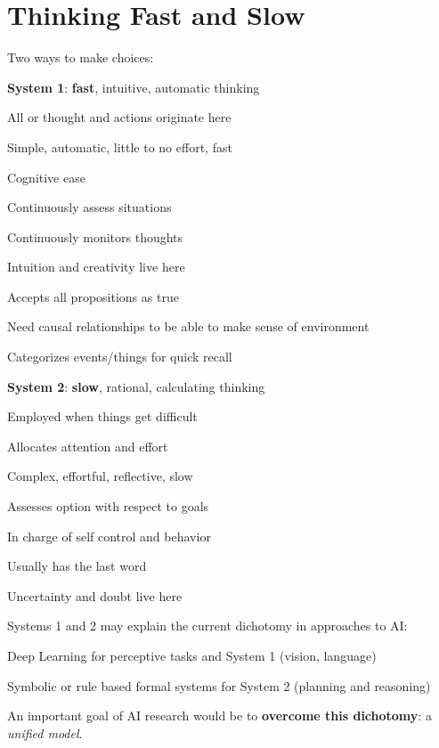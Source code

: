 \documentclass[10pt]{report}
\begin{document}
\section{Thinking Fast and Slow}
Two ways to make choices:
\begin{multicols}{2}
\begin{list}{}{}
	\item \textbf{System 1}: \textbf{fast}, intuitive, automatic thinking
	\begin{list}{}{}
		\item All or thought and actions originate here
		\item Simple, automatic, little to no effort, fast
		\item Cognitive ease
		\item Continuously assess situations
		\item Continuously monitors thoughts
		\item Intuition and creativity live here
		\item Accepts all propositions as true
		\item Need causal relationships to be able to make sense of environment
		\item Categorizes events/things for quick recall
	\end{list}
	\columnbreak
	\item \textbf{System 2}: \textbf{slow}, rational, calculating thinking
	\begin{list}{}{}
		\item Employed when things get difficult
		\item Allocates attention and effort
		\item Complex, effortful, reflective, slow
		\item Assesses option with respect to goals
		\item In charge of self control and behavior
		\item Usually has the last word
		\item Uncertainty and doubt live here
	\end{list}
\end{list}
\end{multicols}
Systems 1 and 2 may explain the current dichotomy in approaches to AI:
\begin{list}{}{}
	\item Deep Learning for perceptive tasks and System 1 (vision, language)
	\item Symbolic or rule based formal systems for System 2 (planning and reasoning)
\end{list}
An important goal of AI research would be to \textbf{overcome this dichotomy}: a \textit{unified model}.
\pagebreak
\end{document}
